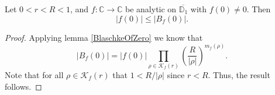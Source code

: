 \begin{lemma}
\label{norm_fOfZero_le_norm_BlaschkeOfZero}
\leanok
Let $0 < r < R<1$, and $f:\mathbb{C}\to\mathbb{C}$ be analytic on $\overline{\mathbb{D}_1}$ with
    $f(0)\neq 0$. Then
    $$|f(0)|\leq|B_f(0)|.$$
\end{lemma}
\begin{proof}
\leanok
Applying lemma \ref{BlaschkeOfZero} we know that
    $$|B_f(0)|=|f(0)|\prod_{\rho\in\mathcal{K}_f(r)}
      \left(\frac{R}{|\rho|}\right)^{m_f(\rho)}.$$
    Note that for all $\rho\in\mathcal{K}_f(r)$ that $1<R/|\rho|$ since $r<R$.
    Thus, the result follows.
\end{proof}

